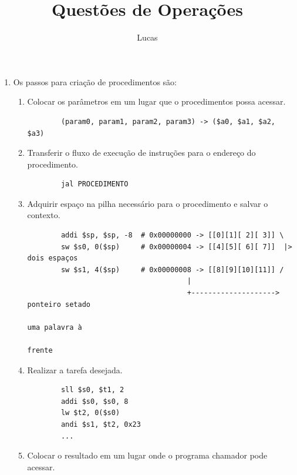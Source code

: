 \documentclass{article}
\author{Lucas}
\title{Questões de Operações}
\begin{document}
\maketitle

\begin{enumerate}

\item Os passos para criação de procedimentos são:

  \begin{enumerate}
    \item Colocar os parâmetros em um lugar que o procedimentos possa acessar.

      \begin{verbatim}
        (param0, param1, param2, param3) -> ($a0, $a1, $a2, $a3)
      \end{verbatim}

    \item Transferir o fluxo de execução de instruções para o endereço do
    procedimento.

      \begin{verbatim}
        jal PROCEDIMENTO
      \end{verbatim}

    \item Adquirir espaço na pilha necessário para o procedimento e salvar o
    contexto.

      \begin{verbatim}
        addi $sp, $sp, -8  # 0x00000000 -> [[0][1][ 2][ 3]] \
        sw $s0, 0($sp)     # 0x00000004 -> [[4][5][ 6][ 7]]  |> dois espaços
        sw $s1, 4($sp)     # 0x00000008 -> [[8][9][10][11]] /
                                      |
                                      +--------------------> ponteiro setado
                                                             uma palavra à
                                                             frente
      \end{verbatim}

    \item Realizar a tarefa desejada.

      \begin{verbatim}
        sll $s0, $t1, 2
        addi $s0, $s0, 8
        lw $t2, 0($s0)
        andi $s1, $t2, 0x23
        ...
      \end{verbatim}

    \item Colocar o resultado em um lugar onde o programa chamador pode acessar.


\end{enumerate}
\end{enumerate}
\end{document}
